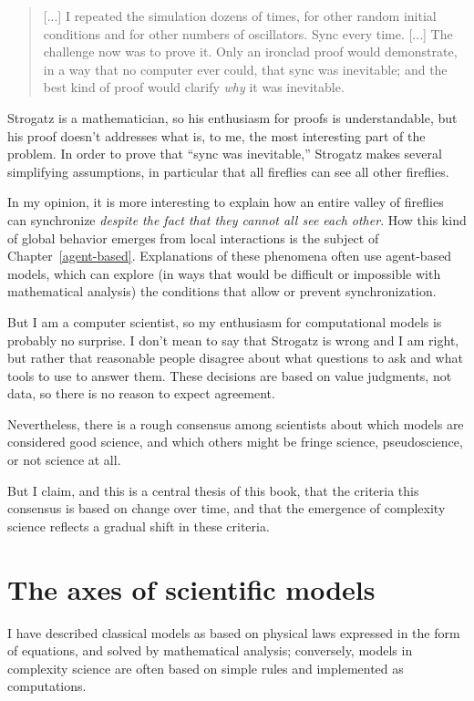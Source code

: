 \documentclass[10pt]{book}
\begin{document}
\begin{quote}
[...] I repeated the simulation dozens of times, for other random
initial conditions and for other numbers of oscillators.  Sync
every time. [...] The challenge now was to prove it.  Only an
ironclad proof would demonstrate, in a way that no computer ever
could, that sync was inevitable; and the best kind of proof would
clarify {\em why} it was inevitable.
\end{quote}

Strogatz is a mathematician, so his enthusiasm for proofs is
understandable, but his proof doesn't addresses what is,
to me, the most interesting part of the problem.
In order to prove that ``sync was inevitable,''
Strogatz makes several simplifying assumptions, in particular
that all fireflies can see all other fireflies.

In my opinion, it is more interesting to explain how an
entire valley of fireflies can synchronize {\em despite the fact that
they cannot all see each other}.  How this kind of global behavior
emerges from local interactions is the subject of
Chapter~\ref{agent-based}.  Explanations of these phenomena
often use agent-based models, which can explore
(in ways that would be difficult or impossible with
mathematical analysis) the conditions that allow or prevent
synchronization.

But I am a computer scientist, so my enthusiasm for computational
models is probably no surprise.  I don't mean to say that Strogatz
is wrong and I am right, but rather that reasonable people
disagree about what questions to ask and what tools to use to answer
them.  These decisions are based on value judgments, not data, so
there is no reason to expect agreement.

Nevertheless, there is a rough consensus among scientists
about which models are considered good science, and which others
might be fringe science, pseudoscience, or not science at all.

But I claim, and this is a central thesis of this book, that the
criteria this consensus is based on change over time, and that
the emergence of complexity science reflects a gradual shift in
these criteria.


\section{The axes of scientific models}

I have described classical models as based on physical laws
expressed in the form of equations, and solved by mathematical
analysis; conversely, models in complexity science are often
based on simple rules and implemented as computations.
\end{document}
